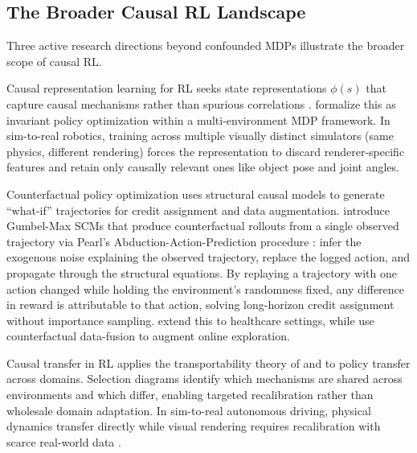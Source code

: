 \subsection{The Broader Causal RL Landscape}
\label{subsec:causal_rl_landscape}

Three active research directions beyond confounded MDPs illustrate the broader scope of causal RL.

Causal representation learning for RL seeks state representations $\phi(s)$ that capture causal mechanisms rather than spurious correlations \citep{scholkopf2021toward}. \citet{dacostacunha2025unifying} formalize this as invariant policy optimization within a multi-environment MDP framework. In sim-to-real robotics, training across multiple visually distinct simulators (same physics, different rendering) forces the representation to discard renderer-specific features and retain only causally relevant ones like object pose and joint angles.

Counterfactual policy optimization uses structural causal models to generate ``what-if'' trajectories for credit assignment and data augmentation. \citet{buesing2019woulda} introduce Gumbel-Max SCMs that produce counterfactual rollouts from a single observed trajectory via Pearl's Abduction-Action-Prediction procedure \citep{pearl2009causality}: infer the exogenous noise explaining the observed trajectory, replace the logged action, and propagate through the structural equations. By replaying a trajectory with one action changed while holding the environment's randomness fixed, any difference in reward is attributable to that action, solving long-horizon credit assignment without importance sampling. \citet{oberst2019counterfactual} extend this to healthcare settings, while \citet{forney2017counterfactual} use counterfactual data-fusion to augment online exploration.

Causal transfer in RL applies the transportability theory of \citet{pearl2014external} and \citet{bareinboim2016causal} to policy transfer across domains. Selection diagrams identify which mechanisms are shared across environments and which differ, enabling targeted recalibration rather than wholesale domain adaptation. In sim-to-real autonomous driving, physical dynamics transfer directly while visual rendering requires recalibration with scarce real-world data \citep{bareinboim2016causal}.

